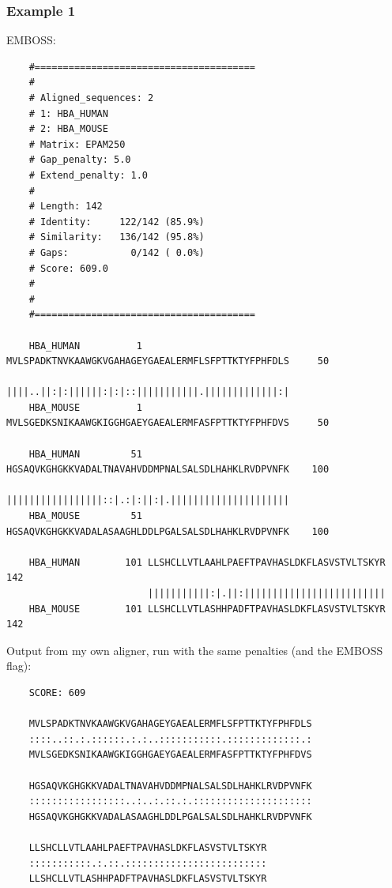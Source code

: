\documentclass{article}
\begin{document}
\subsubsection*{Example 1}
EMBOSS:
\begin{verbatim}
	#=======================================
	#
	# Aligned_sequences: 2
	# 1: HBA_HUMAN
	# 2: HBA_MOUSE
	# Matrix: EPAM250
	# Gap_penalty: 5.0
	# Extend_penalty: 1.0
	#
	# Length: 142
	# Identity:     122/142 (85.9%)
	# Similarity:   136/142 (95.8%)
	# Gaps:           0/142 ( 0.0%)
	# Score: 609.0
	# 
	#
	#=======================================
	
	HBA_HUMAN          1 MVLSPADKTNVKAAWGKVGAHAGEYGAEALERMFLSFPTTKTYFPHFDLS     50
	                     ||||..||:|:||||||:|:|::|||||||||||.|||||||||||||:|
	HBA_MOUSE          1 MVLSGEDKSNIKAAWGKIGGHGAEYGAEALERMFASFPTTKTYFPHFDVS     50
	
	HBA_HUMAN         51 HGSAQVKGHGKKVADALTNAVAHVDDMPNALSALSDLHAHKLRVDPVNFK    100
	                     |||||||||||||||||::|.:|:||:|.|||||||||||||||||||||
	HBA_MOUSE         51 HGSAQVKGHGKKVADALASAAGHLDDLPGALSALSDLHAHKLRVDPVNFK    100
	
	HBA_HUMAN        101 LLSHCLLVTLAAHLPAEFTPAVHASLDKFLASVSTVLTSKYR    142
	                     |||||||||||:|.||:|||||||||||||||||||||||||
	HBA_MOUSE        101 LLSHCLLVTLASHHPADFTPAVHASLDKFLASVSTVLTSKYR    142
\end{verbatim}
Output from my own aligner, run with the same penalties (and the EMBOSS flag):
\begin{verbatim}
	SCORE: 609
	
	MVLSPADKTNVKAAWGKVGAHAGEYGAEALERMFLSFPTTKTYFPHFDLS
	::::..::.:.::::::.:.:..:::::::::::.:::::::::::::.:
	MVLSGEDKSNIKAAWGKIGGHGAEYGAEALERMFASFPTTKTYFPHFDVS
	
	HGSAQVKGHGKKVADALTNAVAHVDDMPNALSALSDLHAHKLRVDPVNFK
	:::::::::::::::::..:..:.::.:.:::::::::::::::::::::
	HGSAQVKGHGKKVADALASAAGHLDDLPGALSALSDLHAHKLRVDPVNFK
	
	LLSHCLLVTLAAHLPAEFTPAVHASLDKFLASVSTVLTSKYR
	:::::::::::.:.::.:::::::::::::::::::::::::
	LLSHCLLVTLASHHPADFTPAVHASLDKFLASVSTVLTSKYR
\end{verbatim}
\end{document}
